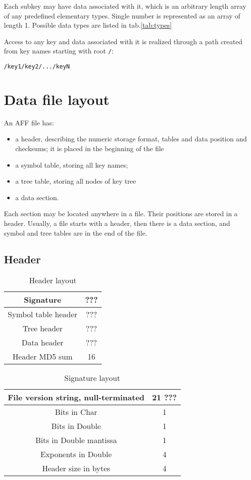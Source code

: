 \documentclass[10pt,letterpaper]{article}
\newcommand{\bc}{\begin{center}}
\newcommand{\ec}{\end{center}}
\newcommand{\bi}{\begin{itemize}}
\newcommand{\ei}{\end{itemize}}             %
\newcommand{\exblock}[1]{\par\texttt{#1}\par}
\newcommand{\example}[1]{\texttt{#1}}
\begin{document}
Each subkey may have data associated with it, which is an arbitrary length array of any
predefined elementary types.
Single number is represented as an array of length 1.
Possible data types are listed in tab.\ref{tab:types}

Access to any key and data associated with it is realized through a path created from
key names starting with root \example{/}:
\exblock{/key1/key2/.../keyN}


\section{Data file layout}

An AFF file has:
\bi
\item a header, describing the numeric storage format, tables and data position and checksums; 
it is placed in the beginning of the file
\item a symbol table, storing all key names;
\item a tree table, storing all nodes of key tree
\item a data section.
\ei

Each section may be located anywhere in a file. 
Their positions are stored in a header. 
Usually, a file starts with a header, then there is a data section, and symbol and tree tables 
are in the end of the file.

\subsection{Header}

\begin{table}[h]
\label{tab:header}
\bc
\caption{Header layout}
\begin{tabular}{|c|c|} \hline
Signature & ??? \\ \hline
Symbol table header & ??? \\ \hline
Tree header & ??? \\ \hline
Data header & ??? \\ \hline
Header MD5 sum & 16 \\ \hline
\end{tabular}
\ec
\end{table}

\begin{table}[h]
\label{tab:signature}
\bc
\caption{Signature layout}
\begin{tabular}{|c|c|} \hline
File version string, null-terminated &  21 ??? \\ \hline
Bits in Char & 1 \\ \hline
Bits in Double & 1 \\ \hline
Bits in Double mantissa & 1 \\ \hline
Exponents in Double & 4 \\ \hline
Header size in bytes & 4 \\ \hline
\end{tabular}
\ec
\end{table}
\end{document}
